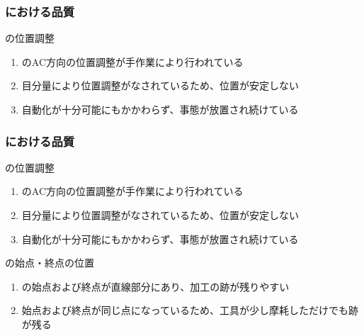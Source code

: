 \subsubsection{\EndFaceOutCChamferMilling における品質}

\begin{Issues}{\EndFaceOutCChamferMilling の位置調整}
\begin{enumerate}[label=\sarrow]
\item[{\sarrow[red]}]\EndFaceOutCChamferMilling のAC方向の位置調整が手作業により行われている
\item[{\sarrow[red]}]目分量により位置調整がなされているため、位置が安定しない
\item[{\sarrow[red]}]自動化が十分可能にもかかわらず、事態が放置され続けている
\end{enumerate}
\end{Issues}

\subsubsection{\EndFaceInCChamferMilling における品質}

\begin{Issues}{\EndFaceInCChamferMilling の位置調整}
\begin{enumerate}[label=\sarrow]
\item[{\sarrow[red]}]\EndFaceInCChamferMilling のAC方向の位置調整が手作業により行われている
\item[{\sarrow[red]}]目分量により位置調整がなされているため、位置が安定しない
\item[{\sarrow[red]}]自動化が十分可能にもかかわらず、事態が放置され続けている
\end{enumerate}
\end{Issues}

\begin{Issues}{\EndFaceInCChamferMilling の始点・終点の位置}
\begin{enumerate}[label=\sarrow]
\item[{\sarrow[red]}]\EndFaceInCChamferMilling の始点および終点が直線部分にあり、加工の跡が残りやすい
\item[{\sarrow[red]}]始点および終点が同じ点になっているため、工具が少し摩耗しただけでも跡が残る
\end{enumerate}
\end{Issues}

